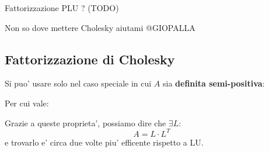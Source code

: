 Fattorizzazione PLU ? (TODO)

Non so dove mettere Cholesky aiutami @GIOPALLA
\subsection{Fattorizzazione di Cholesky}
Si puo' usare solo nel caso speciale in cui $ A $ sia \textbf{definita semi-positiva}:

Per cui vale:

Grazie a queste proprieta', possiamo dire che $ \exists L: $
\[
A = L \cdot L^T
\]
e trovarlo e' circa due volte piu' efficente rispetto a LU.



